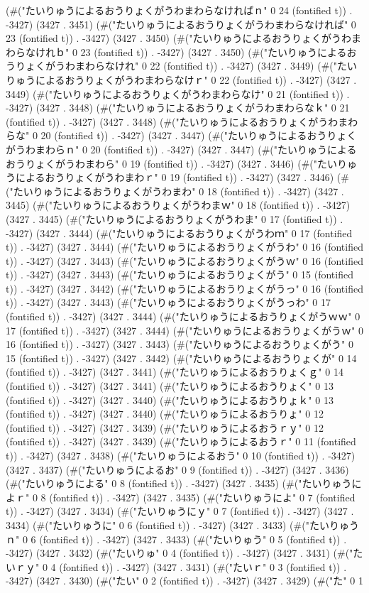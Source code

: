 (#("たいりゅうによるおうりょくがうわまわらなければｎ" 0 24 (fontified t)) . -3427) (3427 . 3451) (#("たいりゅうによるおうりょくがうわまわらなければ" 0 23 (fontified t)) . -3427) (3427 . 3450) (#("たいりゅうによるおうりょくがうわまわらなけれｂ" 0 23 (fontified t)) . -3427) (3427 . 3450) (#("たいりゅうによるおうりょくがうわまわらなけれ" 0 22 (fontified t)) . -3427) (3427 . 3449) (#("たいりゅうによるおうりょくがうわまわらなけｒ" 0 22 (fontified t)) . -3427) (3427 . 3449) (#("たいりゅうによるおうりょくがうわまわらなけ" 0 21 (fontified t)) . -3427) (3427 . 3448) (#("たいりゅうによるおうりょくがうわまわらなｋ" 0 21 (fontified t)) . -3427) (3427 . 3448) (#("たいりゅうによるおうりょくがうわまわらな" 0 20 (fontified t)) . -3427) (3427 . 3447) (#("たいりゅうによるおうりょくがうわまわらｎ" 0 20 (fontified t)) . -3427) (3427 . 3447) (#("たいりゅうによるおうりょくがうわまわら" 0 19 (fontified t)) . -3427) (3427 . 3446) (#("たいりゅうによるおうりょくがうわまわｒ" 0 19 (fontified t)) . -3427) (3427 . 3446) (#("たいりゅうによるおうりょくがうわまわ" 0 18 (fontified t)) . -3427) (3427 . 3445) (#("たいりゅうによるおうりょくがうわまｗ" 0 18 (fontified t)) . -3427) (3427 . 3445) (#("たいりゅうによるおうりょくがうわま" 0 17 (fontified t)) . -3427) (3427 . 3444) (#("たいりゅうによるおうりょくがうわｍ" 0 17 (fontified t)) . -3427) (3427 . 3444) (#("たいりゅうによるおうりょくがうわ" 0 16 (fontified t)) . -3427) (3427 . 3443) (#("たいりゅうによるおうりょくがうｗ" 0 16 (fontified t)) . -3427) (3427 . 3443) (#("たいりゅうによるおうりょくがう" 0 15 (fontified t)) . -3427) (3427 . 3442) (#("たいりゅうによるおうりょくがうっ" 0 16 (fontified t)) . -3427) (3427 . 3443) (#("たいりゅうによるおうりょくがうっわ" 0 17 (fontified t)) . -3427) (3427 . 3444) (#("たいりゅうによるおうりょくがうｗｗ" 0 17 (fontified t)) . -3427) (3427 . 3444) (#("たいりゅうによるおうりょくがうｗ" 0 16 (fontified t)) . -3427) (3427 . 3443) (#("たいりゅうによるおうりょくがう" 0 15 (fontified t)) . -3427) (3427 . 3442) (#("たいりゅうによるおうりょくが" 0 14 (fontified t)) . -3427) (3427 . 3441) (#("たいりゅうによるおうりょくｇ" 0 14 (fontified t)) . -3427) (3427 . 3441) (#("たいりゅうによるおうりょく" 0 13 (fontified t)) . -3427) (3427 . 3440) (#("たいりゅうによるおうりょｋ" 0 13 (fontified t)) . -3427) (3427 . 3440) (#("たいりゅうによるおうりょ" 0 12 (fontified t)) . -3427) (3427 . 3439) (#("たいりゅうによるおうｒｙ" 0 12 (fontified t)) . -3427) (3427 . 3439) (#("たいりゅうによるおうｒ" 0 11 (fontified t)) . -3427) (3427 . 3438) (#("たいりゅうによるおう" 0 10 (fontified t)) . -3427) (3427 . 3437) (#("たいりゅうによるお" 0 9 (fontified t)) . -3427) (3427 . 3436) (#("たいりゅうによる" 0 8 (fontified t)) . -3427) (3427 . 3435) (#("たいりゅうによｒ" 0 8 (fontified t)) . -3427) (3427 . 3435) (#("たいりゅうによ" 0 7 (fontified t)) . -3427) (3427 . 3434) (#("たいりゅうにｙ" 0 7 (fontified t)) . -3427) (3427 . 3434) (#("たいりゅうに" 0 6 (fontified t)) . -3427) (3427 . 3433) (#("たいりゅうｎ" 0 6 (fontified t)) . -3427) (3427 . 3433) (#("たいりゅう" 0 5 (fontified t)) . -3427) (3427 . 3432) (#("たいりゅ" 0 4 (fontified t)) . -3427) (3427 . 3431) (#("たいｒｙ" 0 4 (fontified t)) . -3427) (3427 . 3431) (#("たいｒ" 0 3 (fontified t)) . -3427) (3427 . 3430) (#("たい" 0 2 (fontified t)) . -3427) (3427 . 3429) (#("た" 0 1 